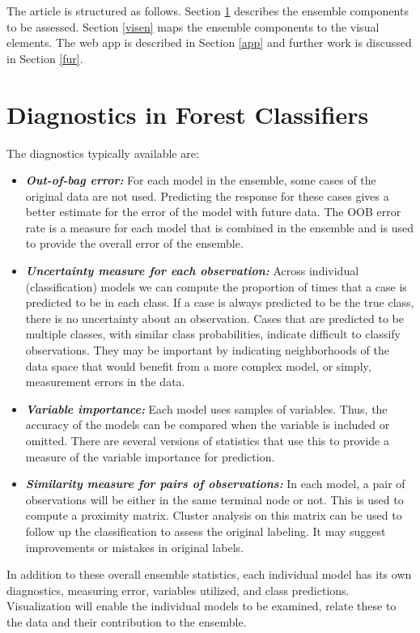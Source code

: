 \documentclass[smallextended,natbib]{svjour3}\usepackage[]{graphicx}\usepackage[]{xcolor}
\begin{document}
The article is structured as follows.  Section \ref{key} describes the ensemble components to be assessed.  Section \ref{visen} maps the ensemble components to the visual elements. The web app is described in Section \ref{app} and further work is discussed in Section \ref{fur}.

\section{Diagnostics in Forest Classifiers}\label{key}

The diagnostics typically available are:

\begin{itemize} \itemsep 0in
\item {\em \textbf{Out-of-bag error:}} For each model in the ensemble, some cases of the original data are not used. Predicting the response for these cases gives a better estimate for the error of the model with future data. The OOB error rate is a measure for each model that is combined in the ensemble and is used to provide the overall error of the ensemble.\\

\item {\em \textbf{Uncertainty measure for each observation:}} Across individual (classification) models we can compute the proportion of times that a case is predicted to be in each class. If a case is always predicted to be the true class, there is no uncertainty about an observation. Cases that are predicted to be multiple classes, with similar class probabilities, indicate  difficult to classify observations. They may be important by indicating neighborhoods of the data space that would benefit from a more complex model, or simply, measurement errors in the data.\\

\item {\em \textbf{Variable importance:}} Each model uses samples of variables. Thus, the accuracy of the models can be compared when the variable is included or omitted. There are several versions of statistics that use this to provide a measure of the variable importance for prediction.\\

\item {\em \textbf{Similarity measure for pairs of observations:}} In each model, a pair of observations will be either in the same terminal node or not. This is used to compute a proximity matrix. Cluster analysis on this matrix can be used to follow up the classification to assess the original labeling. It may suggest improvements or mistakes in original labels.
\end{itemize}
In addition to these overall ensemble statistics, each individual model has its own diagnostics, measuring error, variables utilized, and class predictions. Visualization will enable the individual models to be examined, relate these to the data and their contribution to the ensemble.
\end{document}
